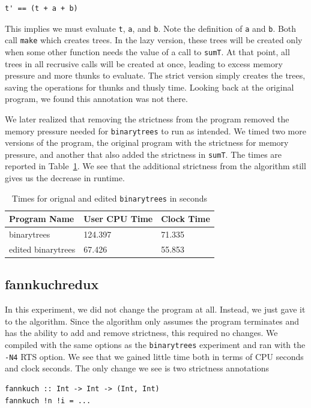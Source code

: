 \documentclass[preprint,nocopyrightspace]{sigplanconf}
\begin{document}
\begin{lstlisting}
t' == (t + a + b)
\end{lstlisting}
This implies we must evaluate \lstinline!t!, \lstinline!a!, and \lstinline!b!. Note the definition of \lstinline!a! and \lstinline!b!. Both call \lstinline!make! which creates trees. In the lazy version, these trees will be created only when some other function needs the value of a call to \lstinline!sumT!. At that point, all trees in all recrusive calls will be created at once, leading to excess memory pressure and more thunks to evaluate. The strict version simply creates the trees, saving the operations for thunks and thusly time. Looking back at the original program, we found this annotation was not there. 

We later realized that removing the strictness from the program removed the memory pressure needed for \lstinline!binarytrees! to run as intended. We timed two more versions of the program, the original program with the strictness for memory pressure, and another that also added the strictness in \lstinline!sumT!. The times are reported in Table~\ref{tab:btree}. We see that the additional strictness from the algorithm still gives us the decrease in runtime.
\begin{table}[t]
\label{tab:btree}
\begin{tabular}{| l | l | l |}
\hline
Program Name & User CPU Time & Clock Time\\
\hline
binarytrees & 124.397 & 71.335\\
\hline
edited binarytrees & 67.426 & 55.853\\
\hline
\end{tabular}
\caption{Times for orignal and edited \lstinline!binarytrees! in seconds}
\end{table}
\subsection{fannkuchredux}
In this experiment, we did not change the program at all. Instead, we just gave it to the algorithm. Since the algorithm only assumes the program terminates and has the ability to add and remove strictness, this required no changes. We compiled with the same options as the \lstinline!binarytrees! experiment and ran with the \lstinline!-N4! RTS option. We see that we gained little time both in terms of CPU seconds and clock seconds. The only change we see is two strictness annotations
\begin{lstlisting}
fannkuch :: Int -> Int -> (Int, Int)
fannkuch !n !i = ...
\end{lstlisting}
\end{document}
